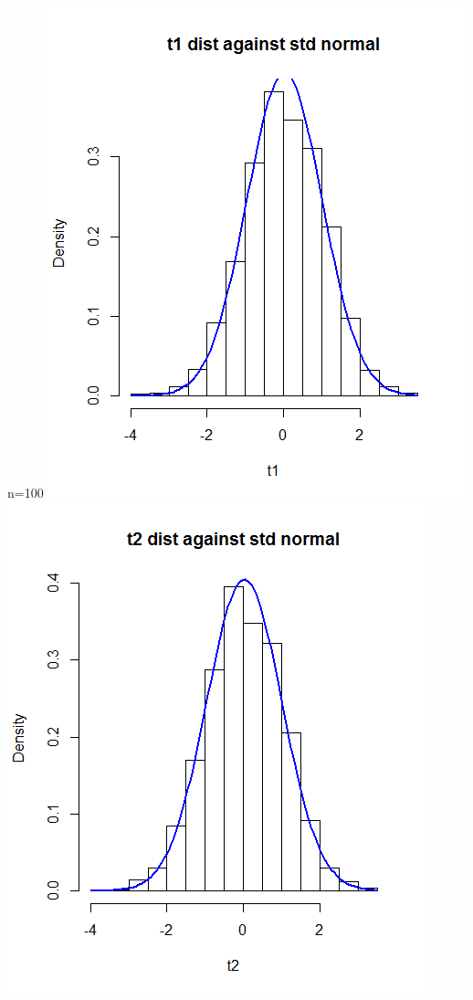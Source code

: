\documentclass{article}
\begin{document}
\begin{enumerate}
\begin{enumerate}
\begin{center}
									\newline
									n=100 \newline
									 \includegraphics[scale=.5]{t1_100}
										\includegraphics[scale=.5]{t2_100}

\end{center}
\end{enumerate}
\end{enumerate}
\end{document}
